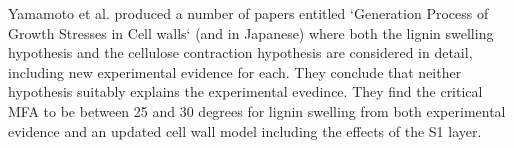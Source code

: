 Yamamoto et al. produced a number of papers entitled `Generation Process of
Growth Stresses in Cell walls` \citep{ISI:A1991FD97000001,ISI:A1992HP18200001,ISI:A1993LM28800002,ISI:A1993LE99600003,ISI:A1995QJ03000001} (and \citep{ISI:A1988R357800002,ISI:A1990EL71100002} in Japanese) where both the lignin swelling
hypothesis and the cellulose contraction hypothesis are considered in detail,
including new experimental evidence for each. They conclude that neither hypothesis suitably explains the experimental evedince. They find the critical MFA to be between 25 and 30 degrees for lignin swelling from both experimental evidence and an updated cell wall model including the effects of the S1 layer. 